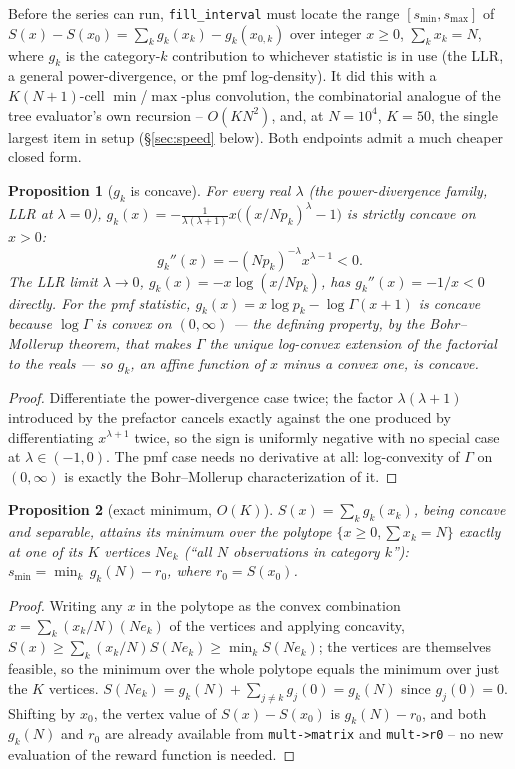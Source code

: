 \documentclass[11pt]{article}
\newtheorem{proposition}{Proposition}
\begin{document}
Before the series can run, \texttt{fill\_interval} must locate the range $[s_{\min},s_{\max}]$ of
$S(x)-S(x_0)=\sum_kg_k(x_k)-g_k(x_{0,k})$ over integer $x\ge0$, $\sum_kx_k=N$, where $g_k$ is the
category-$k$ contribution to whichever statistic is in use (the LLR, a general power-divergence, or
the pmf log-density). It did this with a $K(N{+}1)$-cell $\min$/$\max$-plus convolution, the
combinatorial analogue of the tree evaluator's own recursion -- $O(KN^2)$, and, at $N=10^4$,
$K=50$, the single largest item in setup (\S\ref{sec:speed} below). Both endpoints admit a
much cheaper closed form.

\begin{proposition}[$g_k$ is concave]
\label{prop:gconcave}
For every real $\lambda$ (the power-divergence family, LLR at $\lambda=0$), $g_k(x)=
-\tfrac1{\lambda(\lambda+1)}x\big((x/Np_k)^\lambda-1\big)$ is strictly concave on $x>0$:
\[
  g_k''(x)=-(Np_k)^{-\lambda}x^{\lambda-1}<0.
\]
The LLR limit $\lambda\to0$, $g_k(x)=-x\log(x/Np_k)$, has $g_k''(x)=-1/x<0$ directly. For the pmf
statistic, $g_k(x)=x\log p_k-\log\Gamma(x{+}1)$ is concave because $\log\Gamma$ is convex on
$(0,\infty)$ --- the defining property, by the Bohr--Mollerup theorem, that makes $\Gamma$ the
unique log-convex extension of the factorial to the reals --- so $g_k$, an affine function of $x$
minus a convex one, is concave.
\end{proposition}
\begin{proof}
Differentiate the power-divergence case twice; the factor $\lambda(\lambda+1)$ introduced by the
prefactor cancels exactly against the one produced by differentiating $x^{\lambda+1}$ twice, so the
sign is uniformly negative with no special case at $\lambda\in(-1,0)$. The pmf case needs no
derivative at all: log-convexity of $\Gamma$ on $(0,\infty)$ is exactly the Bohr--Mollerup
characterization of it.
\end{proof}

\begin{proposition}[exact minimum, $O(K)$]
\label{prop:intervalmin}
$S(x)=\sum_kg_k(x_k)$, being concave and separable, attains its minimum over the polytope
$\{x\ge0,\sum x_k=N\}$ exactly at one of its $K$ vertices $Ne_k$ (``all $N$ observations in category
$k$''): $s_{\min}=\min_k\,g_k(N)-r_0$, where $r_0=S(x_0)$.
\end{proposition}
\begin{proof}
Writing any $x$ in the polytope as the convex combination $x=\sum_k(x_k/N)(Ne_k)$ of the vertices
and applying concavity, $S(x)\ge\sum_k(x_k/N)S(Ne_k)\ge\min_kS(Ne_k)$; the vertices are themselves
feasible, so the minimum over the whole polytope equals the minimum over just the $K$ vertices.
$S(Ne_k)=g_k(N)+\sum_{j\ne k}g_j(0)=g_k(N)$ since $g_j(0)=0$. Shifting by $x_0$, the vertex value
of $S(x)-S(x_0)$ is $g_k(N)-r_0$, and both $g_k(N)$ and $r_0$ are already available from
\texttt{mult->matrix} and \texttt{mult->r0} -- no new evaluation of the reward function is needed.
\end{proof}
\end{document}
